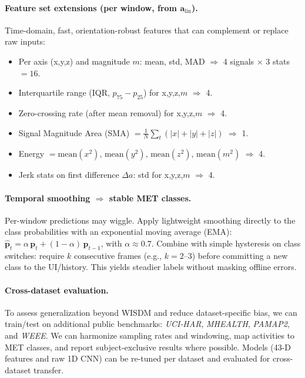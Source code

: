 \documentclass[10pt,twocolumn]{article}
\begin{document}
\paragraph{Feature set extensions (per window, from $\mathbf{a}_{\text{lin}}$).}
Time-domain, fast, orientation-robust features that can complement or replace raw inputs:
\begin{itemize}
  \item Per axis (x,y,z) and magnitude $m$: mean, std, MAD $\Rightarrow$ 4 signals $\times$ 3 stats $=16$.
  \item Interquartile range (IQR, $p_{75}-p_{25}$) for x,y,z,$m$ $\Rightarrow$ 4.
  \item Zero-crossing rate (after mean removal) for x,y,z,$m$ $\Rightarrow$ 4.
  \item Signal Magnitude Area (SMA) $= \tfrac{1}{N}\sum_{t}(|x|+|y|+|z|)$ $\Rightarrow$ 1.
  \item Energy $= \text{mean}(x^2),\,\text{mean}(y^2),\,\text{mean}(z^2),\,\text{mean}(m^2)$ $\Rightarrow$ 4.
  \item Jerk stats on first difference $\Delta a$: std for x,y,z,$m$ $\Rightarrow$ 4.
\end{itemize}

\paragraph{Temporal smoothing $\Rightarrow$ stable MET classes.}
Per-window predictions may wiggle. Apply lightweight smoothing directly to the class probabilities with an exponential moving average (EMA): $\hat{\mathbf{p}}_t = \alpha\, \mathbf{p}_t + (1-\alpha)\, \hat{\mathbf{p}}_{t-1}$, with $\alpha \approx 0.7$. Combine with simple hysteresis on class switches: require $k$ consecutive frames (e.g., $k=2$--$3$) before committing a new class to the UI/history. This yields steadier labels without masking offline errors.


\paragraph{Cross-dataset evaluation.}
To assess generalization beyond WISDM and reduce dataset-specific bias, we can train/test on additional public benchmarks: \emph{UCI-HAR}, \emph{MHEALTH}, \emph{PAMAP2}, and \emph{WEEE}. We can harmonize sampling rates and windowing, map activities to MET classes, and report subject-exclusive results where possible. Models (43-D features and raw 1D CNN) can be re-tuned per dataset and evaluated for cross-dataset transfer.
\end{document}
